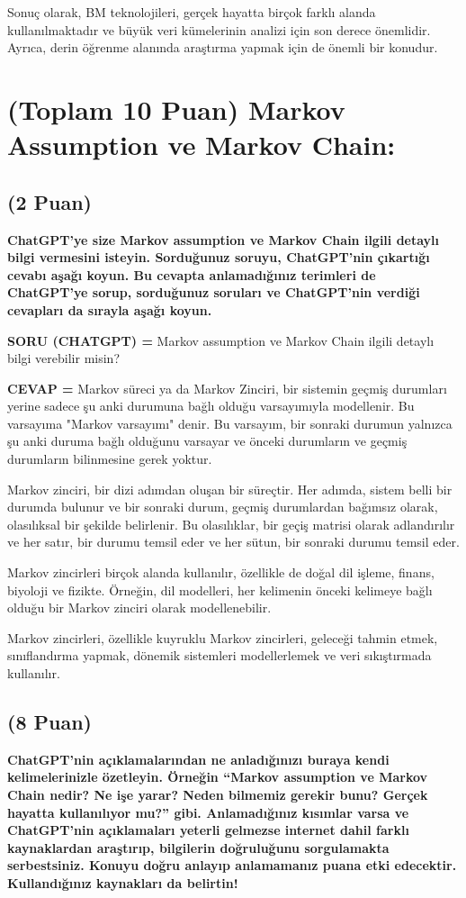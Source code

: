 \documentclass[11pt]{article}
\begin{document}
Sonuç olarak, BM teknolojileri, gerçek hayatta birçok farklı alanda kullanılmaktadır ve büyük veri kümelerinin analizi için son derece önemlidir. Ayrıca, derin öğrenme alanında araştırma yapmak için de önemli bir konudur.

\section{(Toplam 10 Puan) Markov Assumption ve Markov Chain:}

\subsection{(2 Puan)} \textbf{ChatGPT’ye size Markov assumption ve Markov Chain ilgili detaylı bilgi vermesini isteyin. Sorduğunuz soruyu, ChatGPT'nin çıkartığı cevabı aşağı koyun. Bu cevapta anlamadığınız terimleri de ChatGPT’ye sorup, sorduğunuz soruları ve ChatGPT’nin verdiği cevapları da sırayla aşağı koyun.}

\textbf{SORU (CHATGPT) =} Markov assumption ve Markov Chain ilgili detaylı bilgi verebilir misin?

\textbf{CEVAP =} Markov süreci ya da Markov Zinciri, bir sistemin geçmiş durumları yerine sadece şu anki durumuna bağlı olduğu varsayımıyla modellenir. Bu varsayıma "Markov varsayımı" denir. Bu varsayım, bir sonraki durumun yalnızca şu anki duruma bağlı olduğunu varsayar ve önceki durumların ve geçmiş durumların bilinmesine gerek yoktur.

Markov zinciri, bir dizi adımdan oluşan bir süreçtir. Her adımda, sistem belli bir durumda bulunur ve bir sonraki durum, geçmiş durumlardan bağımsız olarak, olasılıksal bir şekilde belirlenir. Bu olasılıklar, bir geçiş matrisi olarak adlandırılır ve her satır, bir durumu temsil eder ve her sütun, bir sonraki durumu temsil eder.

Markov zincirleri birçok alanda kullanılır, özellikle de doğal dil işleme, finans, biyoloji ve fizikte. Örneğin, dil modelleri, her kelimenin önceki kelimeye bağlı olduğu bir Markov zinciri olarak modellenebilir.

Markov zincirleri, özellikle kuyruklu Markov zincirleri, geleceği tahmin etmek, sınıflandırma yapmak, dönemik sistemleri modellerlemek ve veri sıkıştırmada kullanılır.


\subsection{(8 Puan)} \textbf{ChatGPT’nin açıklamalarından ne anladığınızı buraya kendi kelimelerinizle özetleyin. Örneğin ``Markov assumption ve Markov Chain nedir? Ne işe yarar? Neden bilmemiz gerekir bunu? Gerçek hayatta kullanılıyor mu?'' gibi. Anlamadığınız kısımlar varsa ve ChatGPT’nin açıklamaları yeterli gelmezse internet dahil farklı kaynaklardan araştırıp, bilgilerin doğruluğunu sorgulamakta serbestsiniz. Konuyu doğru anlayıp anlamamanız puana etki edecektir. Kullandığınız kaynakları da belirtin!}
\end{document}
